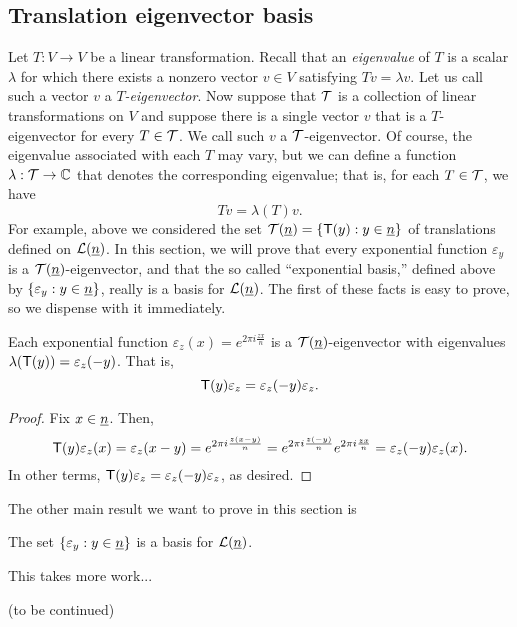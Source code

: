 \subsection{Translation eigenvector basis}
Let $T:V \to V$ be a linear transformation. Recall that an \emph{eigenvalue} of $T$ 
is a scalar $\lambda$ for which there exists a nonzero vector $v\in V$ 
satisfying $Tv = \lambda v$.  Let us call such a vector $v$ a \emph{$T$-eigenvector}.
Now suppose that $\mathcal T$ is a collection of linear transformations on $V$ 
and suppose there is a single vector $v$ that is a $T$-eigenvector for every $T \in \mathcal T$.
We call such $v$ a $\mathcal T$-eigenvector.  
Of course, the eigenvalue associated with each $T$ may vary, but we can define 
a function $\lambda: \mathcal T \to \mathbb C$ that denotes the corresponding eigenvalue; that is,
for each $T\in \mathcal T$, we have
\[
T v = \lambda(T) v.
\]
For example, above we considered the set 
$\mathcal T(\underline{n}) = \{\mathsf{T}(y) : y \in \underline{n}\}$ of translations defined on $\mathcal L(\underline{n})$.
In this section, we will prove that every exponential function $\varepsilon_y$
is a $\mathcal T(\underline{n})$-eigenvector, and that
the so called ``exponential basis,'' defined above 
by $\{\varepsilon_y : y \in \underline{n}\}$, 
really is a basis for $\mathcal L(\underline{n})$.
The first of these facts is easy to prove, so we dispense with it immediately.
\begin{theorem}
Each exponential function 
$\varepsilon_z(x) = e^{2\pi i \frac{zx}{n}}$ is a $\mathcal T(\underline{n})$-eigenvector with eigenvalues
$\lambda(\mathsf{T}(y)) = \varepsilon_z(-y)$.  That is,
\[
\mathsf{T}(y)\varepsilon_z = \varepsilon_z(-y)\varepsilon_z.
\]
\end{theorem}
\begin{proof}
Fix $x\in \underline{n}$.  Then,  
\[
\mathsf{T}(y)\varepsilon_z(x) = \varepsilon_z(x-y) =e^{2\pi i \frac{z(x-y)}{n}}
=e^{2\pi i \frac{z(-y)}{n}}e^{2\pi i \frac{zx}{n}}=
\varepsilon_z(-y)\varepsilon_z(x).
\]
In other terms,
$\mathsf{T}(y)\varepsilon_z = \varepsilon_z(-y)\varepsilon_z$, as desired.
\end{proof}
The other main result we want to prove in this section is
\begin{theorem}
The set $\{\varepsilon_y : y\in \underline{n}\}$ is a basis for $\mathcal L(\underline{n})$.  
\end{theorem}

This takes more work...

\medskip

(to be continued)

